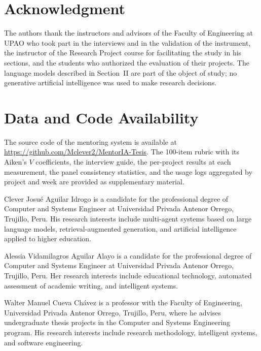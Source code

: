 \documentclass[journal]{IEEEtran}
\begin{document}
\section*{Acknowledgment}

The authors thank the instructors and advisors of the Faculty of Engineering at UPAO who took part in the interviews and in the validation of the instrument, the instructor of the Research Project course for facilitating the study in his sections, and the students who authorized the evaluation of their projects. The language models described in Section~II are part of the object of study; no generative artificial intelligence was used to make research decisions.

\section*{Data and Code Availability}

The source code of the mentoring system is available at \url{https://github.com/Mclever2/MentorIA-Tesis}. The 100-item rubric with its Aiken's $V$ coefficients, the interview guide, the per-project results at each measurement, the panel consistency statistics, and the usage logs aggregated by project and week are provided as supplementary material.




\begin{IEEEbiographynophoto}{Clever Josu\'e Aguilar Idrogo}
is a candidate for the professional degree of Computer and Systems Engineer at Universidad Privada Antenor Orrego, Trujillo, Peru. His research interests include multi-agent systems based on large language models, retrieval-augmented generation, and artificial intelligence applied to higher education.
\end{IEEEbiographynophoto}

\begin{IEEEbiographynophoto}{Alessia Vidamilagros Aguilar Alayo}
is a candidate for the professional degree of Computer and Systems Engineer at Universidad Privada Antenor Orrego, Trujillo, Peru. Her research interests include educational technology, automated assessment of academic writing, and intelligent systems.
\end{IEEEbiographynophoto}

\begin{IEEEbiographynophoto}{Walter Manuel Cueva Ch\'avez}
is a professor with the Faculty of Engineering, Universidad Privada Antenor Orrego, Trujillo, Peru, where he advises undergraduate thesis projects in the Computer and Systems Engineering program. His research interests include research methodology, intelligent systems, and software engineering.
\end{IEEEbiographynophoto}
\end{document}
